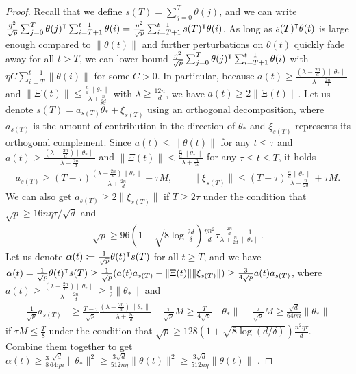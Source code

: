 \begin{proof}
    Recall that we define $s(T) = \sum_{j=0}^T \theta(j)$, and we can write $\frac{\eta^2}{\sqrt p}\sum_{j=0}^T \theta(j)\transpose \sum_{i=T+1}^{t-1} \theta(i) = \frac{\eta^2}{\sqrt p} \sum_{i=T+1}^{t-1} s(T)\transpose \theta(i)$. As long as $s(T)\transpose \theta(t)$ is large enough compared to $\|\theta(t)\|$ and further perturbations on $\theta(t)$ quickly fade away for all $t > T$, we can lower bound $\frac{\eta^2}{\sqrt p}\sum_{j=0}^T \theta(j)\transpose \sum_{i=T+1}^{t-1} \theta(i)$ with $\eta C\sum_{i=T}^{t-1} \|\theta(i)\|$ for some $C>0$. In particular, because $a(t) \geq \frac{(\lambda - \frac{2n}{d})\|\theta_*\|}{\lambda + \frac{2n}{d}}$ and $\|\Xi(t)\| \leq \frac{\frac{n}{d}\|\theta_*\|}{\lambda + \frac{n}{2d}}$ with $\lambda\geq \frac{12n}{d}$, we have $a(t) \geq 2\|\Xi(t)\|$. Let us denote $s(T) = a_{s(T)}\hat\theta_* + \xi_{s(T)}$ using an orthogonal decomposition, where $a_{s(T)}$ is the amount of contribution in the direction of $\theta_*$ and $\xi_{s(T)}$ represents its orthogonal complement. Since $a(t)\leq \|\theta(t)\|$ for any $t\leq \tau$ and $a(t) \geq \frac{(\lambda - \frac{2n}{d})\|\theta_*\|}{\lambda + \frac{2n}{d}}$ and $\|\Xi(t)\| \leq \frac{\frac{n}{d}\|\theta_*\|}{\lambda + \frac{n}{2d}}$ for any $\tau\leq t\leq T$, it holds
    \begin{align*}
        a_{s(T)} \geq (T-\tau) \frac{(\lambda - \frac{2n}{d})\|\theta_*\|}{\lambda + \frac{2n}{d}} - \tau M, \qquad \|\xi_{s(T)}\| \leq (T-\tau) \frac{\frac{n}{d}\|\theta_*\|}{\lambda + \frac{n}{2d}} + \tau M.
    \end{align*}
    We can also get $a_{s(T)} \geq 2 \|\xi_{s(T)}\|$ if $T \geq 2\tau$ under the condition that $\sqrt{p} \geq 16n\eta\tau/\sqrt{d}$ and 
    \begin{align*}
        \sqrt{p} \geq 96\left(1 + \sqrt{8\log\frac{2d}{\delta}}\right)\frac{\eta n^2}{d}\tau \frac{\frac{2n}{d}}{\lambda + \frac{n}{2d}}\frac{1}{\|\theta_*\|}.
    \end{align*}
    Let us denote $\alpha(t) \defeq \frac{1}{\sqrt{p}}\theta(t)\transpose s(T)$ for all $t\geq T$, and we have $\alpha(t) = \frac{1}{\sqrt{p}}\theta(t)\transpose s(T) \geq \frac{1}{\sqrt{p}}(a(t) a_{s(T)} - \|\Xi(t)\|\|\xi_{s(T)}\|) \geq \frac{3}{4\sqrt{p}} a(t) a_{s(T)}$, where $a(t) \geq \frac{(\lambda - \frac{2n}{d})\|\theta_*\|}{\lambda + \frac{2n}{d}} \geq \frac{1}{2}\|\theta_*\|$ and 
    \begin{align*}
        \frac{1}{\sqrt{p}} a_{s(T)} & \geq \frac{T-\tau}{\sqrt{p}} \frac{(\lambda - \frac{2n}{d})\|\theta_*\|}{\lambda + \frac{2n}{d}} - \frac{\tau}{\sqrt{p}} M \geq \frac{T}{4\sqrt{p}} \|\theta_*\| - \frac{\tau}{\sqrt{p}} M \geq \frac{\sqrt{d}}{64\eta n} \|\theta_*\|
    \end{align*}
    if $\tau M \leq \frac{T}{8}$ under the condition that $\sqrt{p}\geq 128 \left(1 + \sqrt{8\log(d/\delta)}\right) \frac{n^2\eta\tau}{d}$. Combine them together to get $\alpha(t) \geq \frac{3}{8}\frac{\sqrt{d}}{64\eta n} \|\theta_*\|^2 \geq \frac{3\sqrt{d}}{512n\eta} \|\theta(t)\|^2 \geq \frac{3\sqrt{d}}{512n\eta} \|\theta(t)\|$ .
    

\end{proof}
